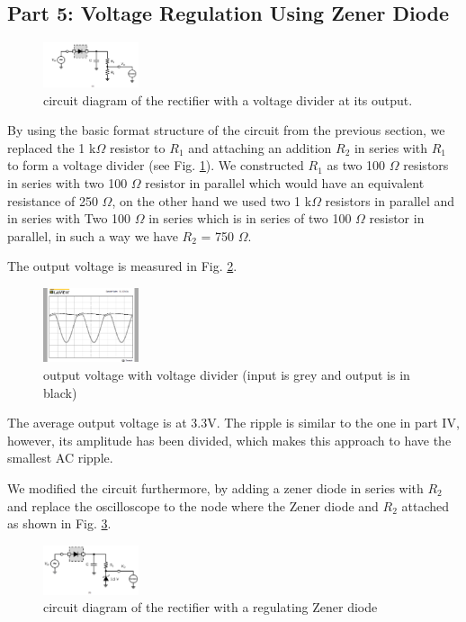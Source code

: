 \documentclass[letterpaper, 10 pt, conference]{ieeeconf}  %
\begin{document}
\subsection{Part 5: Voltage Regulation Using Zener Diode}
\begin{figure}[h]
  \centering
  \includegraphics[width=0.25\textwidth]{images/5_1.png}
  \caption{circuit diagram of the rectifier with a voltage divider at its output.}
  \label{fig:5.1}
\end{figure}
By using the basic format structure of the circuit from the previous section,
we replaced the 1 k$\Omega$ resistor to $R_{1}$ and attaching an addition
$R_{2}$ in series with $R_{1}$ to form a voltage divider (see Fig. \ref{fig:5.1}).
We constructed $R_{1}$ as two 100 $\Omega$ resistors in series with two 100
$\Omega$ resistor in parallel which would have an equivalent resistance of
250 $\Omega$, on the other hand we used two 1 k$\Omega$ resistors in parallel
and in series with Two 100 $\Omega$ in series which is in series of two 100
$\Omega$ resistor in parallel, in such a way we have $R_{2}$ = 750 $\Omega$.
\par The output voltage is measured in Fig. \ref{fig:5.2}.
\begin{figure}[h]
  \centering
  \includegraphics[width=0.25\textwidth]{images/5_2.png}
  \caption{output voltage with voltage divider (input is grey and output is in black)}
  \label{fig:5.2}
\end{figure}
\par The average output voltage is at 3.3V.
The ripple is similar to the one in part IV, however, its amplitude has been divided,
which makes this approach to have the smallest AC ripple.
\par We modified the circuit furthermore, by adding a zener diode in
series with $R_{2}$ and replace the oscilloscope to the node where the Zener diode
and $R_{2}$ attached as shown in Fig. \ref{fig:5.3}.
\begin{figure}[h]
  \centering
  \includegraphics[width=0.25\textwidth]{images/5_3.png}
  \caption{circuit diagram of the rectifier with a regulating Zener diode}
  \label{fig:5.3}
\end{figure}
\end{document}
